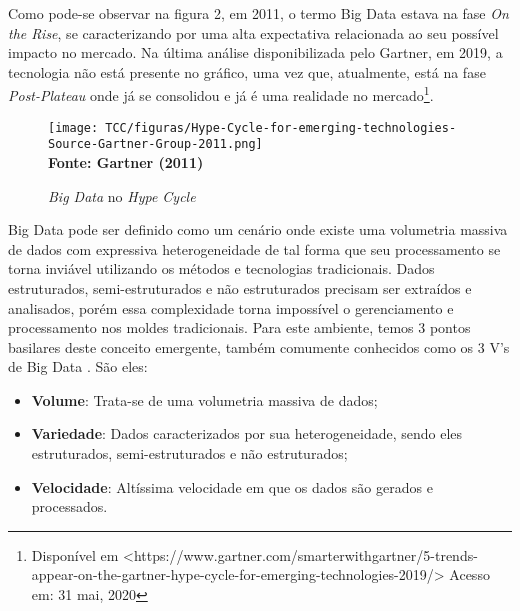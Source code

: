 Como pode-se observar na figura 2, em 2011, o termo Big Data estava na fase \textit{On the Rise}, se caracterizando por uma alta expectativa relacionada ao seu possível impacto no mercado. Na última análise disponibilizada pelo Gartner, em 2019, a tecnologia não está presente no gráfico, uma vez que, atualmente, está na fase \textit{Post-Plateau} onde já se consolidou e já é uma realidade no mercado\footnote{Disponível em <https://www.gartner.com/smarterwithgartner/5-trends-appear-on-the-gartner-hype-cycle-for-emerging-technologies-2019/> Acesso em: 31 mai, 2020}.

\begin{figure}[H]
	\centering	
	\caption[\hspace{0.1cm}\textit{Big Data} no \textit{Hype Cycle}]{\textit{Big Data} no \textit{Hype Cycle}}
	  \vspace{-0.4cm}
	\texttt{[image: TCC/figuras/Hype-Cycle-for-emerging-technologies-Source-Gartner-Group-2011.png]}
	 \vspace{-0.3cm}
	\\\textbf{\footnotesize Fonte: Gartner (2011)}
	\label{fig:tela1}
\end{figure}

Big Data pode ser definido como um cenário onde existe uma volumetria massiva de dados com expressiva heterogeneidade de tal forma que seu processamento se torna inviável utilizando os métodos e tecnologias tradicionais. Dados estruturados, semi-estruturados e não estruturados precisam ser extraídos e analisados, porém essa complexidade torna impossível o gerenciamento e processamento nos moldes tradicionais. Para este ambiente, temos 3 pontos basilares deste conceito emergente, também comumente conhecidos como os 3 V's de Big Data \cite{bigdatafastdatadatalake}. São eles:
\begin{itemize} 
 \item \textbf{Volume}: Trata-se de uma volumetria massiva de dados; 
 \item \textbf{Variedade}: Dados caracterizados por sua heterogeneidade, sendo eles estruturados, semi-estruturados e não estruturados;
 \item \textbf{Velocidade}: Altíssima velocidade em que os dados são gerados e processados.
\end{itemize}

